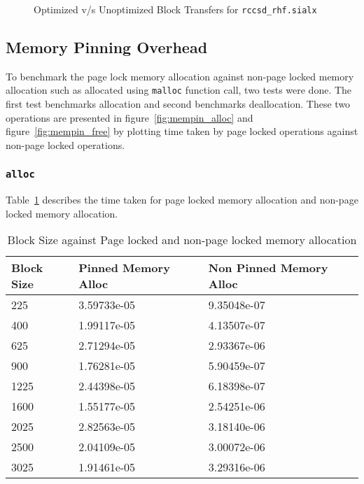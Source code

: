 \begin{figure}[h]
  
  \caption{Optimized v/s Unoptimized Block Transfers for \texttt{rccsd\_rhf.sialx}}
  \label{fig:optimized_block_transfer}
\end{figure}

\subsection{Memory Pinning Overhead}
To benchmark the page lock memory allocation against non-page locked memory allocation
such as allocated using \texttt{malloc} function call, two tests were done. The
first test benchmarks allocation and second benchmarks deallocation. These two
operations are presented in figure~\ref{fig:mempin_alloc} and figure~\ref{fig:mempin_free}
by plotting time taken by page locked operations against non-page locked operations.

\subsubsection{\texttt{alloc}}
Table~\ref{tab:mempin_alloc} describes the time taken for page locked memory allocation
and non-page locked memory allocation.
\begin{table}[h]
  \centering
  \caption{Block Size against Page locked and non-page locked memory allocation}
  \begin{tabular}{l l l}
    \hline
    Block Size & Pinned Memory Alloc & Non Pinned Memory Alloc \\
    \hline
    225        & 3.59733e-05         & 9.35048e-07             \\
    400        & 1.99117e-05         & 4.13507e-07             \\
    625        & 2.71294e-05         & 2.93367e-06             \\
    900        & 1.76281e-05         & 5.90459e-07             \\
    1225       & 2.44398e-05         & 6.18398e-07             \\
    1600       & 1.55177e-05         & 2.54251e-06             \\
    2025       & 2.82563e-05         & 3.18140e-06             \\
    2500       & 2.04109e-05         & 3.00072e-06             \\
    3025       & 1.91461e-05         & 3.29316e-06             \\
    \hline
  \end{tabular}
  \label{tab:mempin_alloc}
\end{table}

